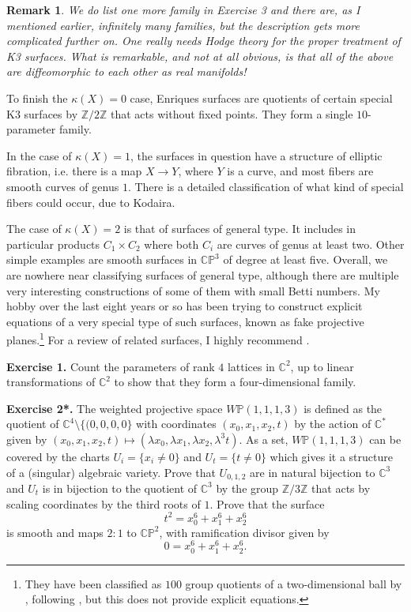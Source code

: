\documentclass[11pt]{article}
\numberwithin{equation}{section}
\numberwithin{footnote}{section}
\newtheorem{rem}[thm]{Remark}
\newcommand{\blue}{\color{blue}}
\renewcommand{\P}{{\mathbb P}}
\newcommand{\Z}{{\mathbb Z}}
\newcommand{\C}{{\mathbb C}}
\begin{document}
\smallskip
\begin{rem}
We do list one more family in Exercise 3 and there are, as I mentioned earlier, infinitely many families, but the description gets more complicated further on. One really needs Hodge theory for the proper treatment of K3 surfaces.
What is remarkable, and not at all obvious, is that all of the above are {\blue diffeomorphic to each other as real manifolds!}
\end{rem}

\smallskip 
To finish the  $\kappa(X) = 0$ case,
Enriques surfaces are quotients of certain special K3 surfaces by $\Z/2\Z$ that acts without fixed points. They form a single $10$-parameter family.

\smallskip
In the case of $\kappa(X) = 1$, the surfaces in question have a structure of {\blue elliptic fibration}, i.e. there is a map
$X\to Y$, where $Y$ is a curve, and most fibers are smooth curves of genus $1$. There is a detailed classification of what kind of special fibers could occur, due to Kodaira.

\smallskip
The case of $\kappa(X) = 2$ is that of {\blue surfaces of general type}. It includes in particular products $C_1\times C_2$ 
where both $C_i$ are curves of genus at least two. Other simple examples are smooth surfaces in $\C\P^3$ of degree at least five. Overall, we are nowhere near classifying surfaces of general type, although there are multiple very interesting constructions of some of them with small Betti numbers. My hobby over the last eight years or so has been trying to construct explicit equations of a very special type of such surfaces, known as {\blue fake projective planes}.\footnote{ They have been classified as $100$ group quotients of a two-dimensional ball by \cite{CS}, following \cite{PY}, but this does not provide explicit equations.}
For a review of related surfaces, I highly recommend \cite{BCP}.


{\bf Exercise 1.} Count the parameters of rank $4$ lattices in $\C^2$, up to linear transformations of $\C^2$ to show that they form a four-dimensional family.

{\bf Exercise 2*.} The {\blue weighted projective space} $W\P(1,1,1,3)$ is defined as the quotient  of $\C^4\setminus \{(0,0,0,0\}$ with coordinates $(x_0,x_1,x_2,t)$ by the action
of $\C^*$ given by $(x_0,x_1,x_2,t)\mapsto (\lambda x_0,\lambda x_1,\lambda x_2,\lambda^3 t)$. As a set,  $W\P(1,1,1,3)$ can be covered by the charts $U_i=\{x_i\neq 0\}$ and $U_t=\{t\neq 0\}$ which gives it a structure of a (singular) algebraic variety. Prove that $U_{0,1,2}$ are in natural bijection to $\C^3$ and $U_t$ is in bijection to the quotient of $\C^3$ by the group $\Z/3\Z$ that acts by scaling coordinates by the third roots of $1$. Prove that the surface
$$
t^2 = x_0^6+ x_1^6+ x_2^6
$$
is smooth and maps $2:1$ to $\C\P^2$, with ramification divisor given by 
$$0 =x_0^6+ x_1^6+ x_2^6.$$
\end{document}
